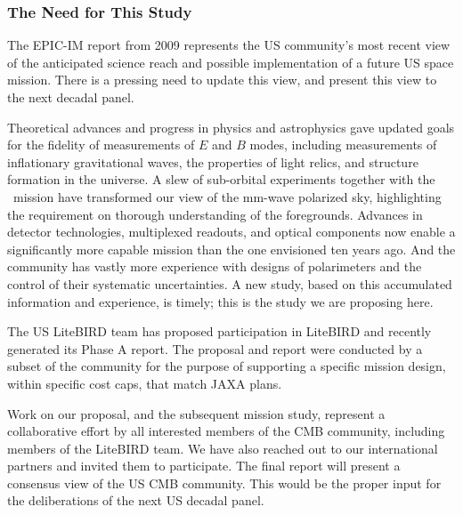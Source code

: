 \subsubsection{The Need for This Study} 

\vspace{-0.05in}

The EPIC-IM report from 2009 represents the US community's most recent view of the anticipated 
science reach and possible implementation of a future US space mission. There is a pressing need 
to update this view, and present this view to the next decadal panel.  

Theoretical advances and progress in physics and astrophysics gave updated 
goals for the fidelity of measurements of $E$ and $B$ modes, including measurements of inflationary 
gravitational waves, the properties of light relics, and structure formation in the universe. A 
slew of sub-orbital experiments together with the \planck\ mission have 
transformed our view of the mm-wave polarized sky, highlighting the requirement on 
thorough understanding of the foregrounds. Advances in detector technologies, multiplexed readouts,
and optical components now enable a significantly more capable mission than the one envisioned
ten years ago. And the community has vastly more experience with designs of polarimeters and 
the control of their systematic uncertainties.  A new study, based on this accumulated information and 
experience, is timely; this is the study we are proposing here. 

The US LiteBIRD team has proposed participation in LiteBIRD and recently generated its Phase A 
report. The proposal and report were conducted by 
a subset of the community for the purpose of supporting a specific mission design, within specific 
cost caps, that match JAXA plans. 

Work on our proposal, and 
the subsequent mission study, represent a collaborative effort by all interested members of the 
CMB community, including members of the LiteBIRD team. We have also reached out to our international partners 
and invited them to participate. The final report will present a consensus view of the US CMB community. 
This would be the proper input for the deliberations of the next US decadal panel. 



























